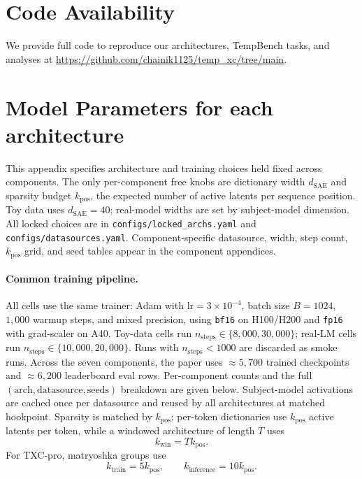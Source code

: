 \appendix

\section{Code Availability}
\label{app:code}
We provide full code to reproduce our architectures, TempBench tasks, and
analyses at \url{https://github.com/chainik1125/temp_xc/tree/main}.

\section{Model Parameters for each architecture}
\label{app:model-params}

This appendix specifies architecture and training choices held fixed across components. The only per-component free knobs are dictionary width $d_{\mathrm{SAE}}$ and sparsity budget $k_{\mathrm{pos}}$, the expected number of active latents per sequence position. Toy data uses $d_{\mathrm{SAE}}=40$; real-model widths are set by subject-model dimension. All locked choices are in \texttt{configs/locked\_archs.yaml} and \texttt{configs/datasources.yaml}. Component-specific datasource, width, step count, $k_{\mathrm{pos}}$ grid, and seed tables appear in the component appendices.

\paragraph{Common training pipeline.}
All cells use the same trainer: Adam with $\mathrm{lr}=3{\times}10^{-4}$, batch size $B=1024$, $1{,}000$ warmup steps, and mixed precision, using \texttt{bf16} on H100/H200 and \texttt{fp16} with grad-scaler on A40. Toy-data cells run $n_{\mathrm{steps}}\in\{8{,}000,30{,}000\}$; real-LM cells run $n_{\mathrm{steps}}\in\{10{,}000,20{,}000\}$. Runs with $n_{\mathrm{steps}}<1000$ are discarded as smoke runs. Across the seven components, the paper uses $\approx5{,}700$ trained checkpoints and $\approx6{,}200$ leaderboard eval rows. Per-component counts and the full $(\text{arch},\text{datasource},\text{seeds})$ breakdown are given below. Subject-model activations are cached once per datasource and reused by all architectures at matched hookpoint. Sparsity is matched by $k_{\mathrm{pos}}$: per-token dictionaries use $k_{\mathrm{pos}}$ active latents per token, while a windowed architecture of length $T$ uses
\[
    k_{\mathrm{win}}=T k_{\mathrm{pos}}.
\]
For TXC-pro, matryoshka groups use
\[
    k_{\mathrm{train}}=5k_{\mathrm{pos}},
    \qquad
    k_{\mathrm{inference}}=10k_{\mathrm{pos}}.
\]

